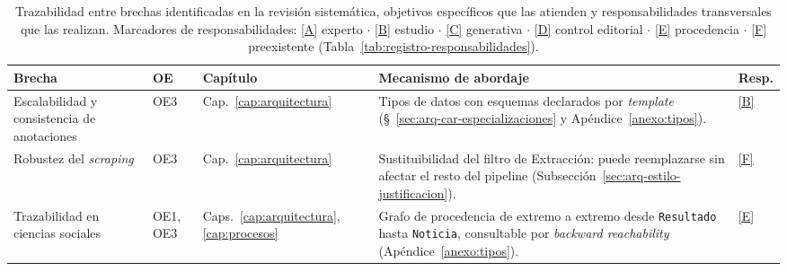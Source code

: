 \documentclass[12pt]{report}
\DeclareRobustCommand{\resp}[1]{\hyperref[tab:registro-responsabilidades]{\textcolor{respcolor}{[#1]}}}
\DeclareRobustCommand{\respleyenda}{Marcadores de responsabilidades: \resp{A} experto \(\cdot\) \resp{B} estudio \(\cdot\) \resp{C} generativa \(\cdot\) \resp{D} control editorial \(\cdot\) \resp{E} procedencia \(\cdot\) \resp{F} preexistente (Tabla~\ref{tab:registro-responsabilidades}).}
\begin{document}
\begin{table}[H]
  \centering
  \caption{Trazabilidad entre brechas identificadas en la revisión sistemática, objetivos específicos que las atienden y responsabilidades transversales que las realizan. \respleyenda}
  \label{tab:trazabilidad-brechas-objetivos}
  \footnotesize
  \setlength{\tabcolsep}{4pt}
  \begin{tabularx}{\textwidth}{@{}>{\raggedright\arraybackslash}p{3.2cm} l l X l@{}}
    \toprule
    \textbf{Brecha} & \textbf{OE}                                                                                                                                                                 & \textbf{Capítulo}                                & \textbf{Mecanismo de abordaje} & \textbf{Resp.} \\
    \midrule
    Escalabilidad y consistencia de anotaciones
                    & OE3                                                                                                                                                                         & Cap.~\ref{cap:arquitectura}
                    & Tipos de datos con esquemas declarados por \textit{template} (\S~\ref{sec:arq-car-especializaciones} y Apéndice~\ref{anexo:tipos}).                                         & \resp{B}                                                                                           \\
    \addlinespace
    Robustez del \textit{scraping}
                    & OE3                                                                                                                                                                         & Cap.~\ref{cap:arquitectura}
                    & Sustituibilidad del filtro de Extracción: puede reemplazarse sin afectar el resto del pipeline (Subsección~\ref{sec:arq-estilo-justificacion}).                             & \resp{F}                                                                                           \\
    \addlinespace
    Trazabilidad en ciencias sociales
                    & OE1, OE3                                                                                                                                                                    & Caps.~\ref{cap:arquitectura}, \ref{cap:procesos}
                    & Grafo de procedencia de extremo a extremo desde \texttt{Resultado} hasta \texttt{Noticia}, consultable por \textit{backward reachability} (Apéndice~\ref{anexo:tipos}).     & \resp{E}                                                                                           \\

\end{tabularx}
\end{table}
\end{document}
